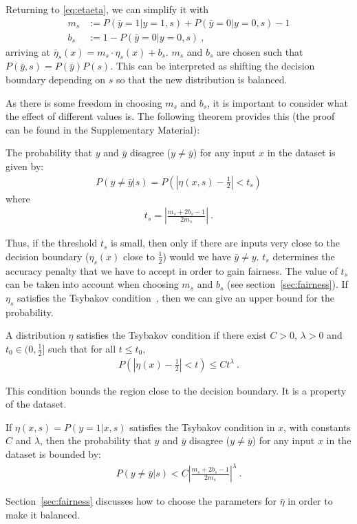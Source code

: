 Returning to \eqref{eq:etaeta}, we can simplify it with
\begin{align}
  m_s &:= P(\bar{y}=1|y=1,s) + P(\bar{y}=0|y=0,s) - 1\\
  b_s &:= 1 - P(\bar{y}=0|y=0,s)~,
\end{align}
arriving at $\bar{\eta}_s(x)=m_s\cdot \eta_s(x) + b_s$.
$m_s$ and $b_s$ are chosen such that $P(\bar{y}, s)=P(\bar{y})P(s)$.
This can be interpreted as shifting the decision boundary depending on $s$ so that the new distribution is balanced.

As there is some freedom in choosing $m_s$ and $b_s$, it is important to consider what the effect of different values is.
The following theorem provides this (the proof can be found in the Supplementary Material):

\begin{theorem}\label{th:prob}
  The probability that $y$ and $\bar{y}$ disagree ($y\neq\bar{y}$) for any input $x$ in the dataset is given by:
  \begin{align}
    P(y\neq\bar{y}|s)=P\left(\left|\eta(x,s) - \tfrac{1}{2}\right| < t_s\right)
  \end{align}
  where
  \begin{align}
    t_s = \left|\frac{m_s+2b_s-1}{2m_s}\right|~.\label{eq:def-ts}
  \end{align}
\end{theorem}
Thus, if the threshold $t_s$ is small,
then only if there are inputs very close to the decision boundary ($\eta_s(x)$ close to $\tfrac{1}{2}$)
would we have $\bar{y}\neq y$.
$t_s$ determines the accuracy penalty that we have to accept in order to gain fairness.
The value of $t_s$ can be taken into account when choosing $m_s$ and $b_s$ (see section~\ref{sec:fairness}).
If $\eta_s$ satisfies the Tsybakov condition~\citep{tsybakov2004optimal},
then we can give an upper bound for the probability.
\begin{definition}
  A distribution $\eta$ satisfies the Tsybakov condition if there exist $C>0$, $\lambda > 0$ and $t_0\in (0,\tfrac{1}{2}]$
  such that for all $t\leq t_0$,
  \begin{align}
    P\left(\left|\eta(x)-\tfrac{1}{2}\right|<t\right)\leq Ct^\lambda~.
  \end{align}
\end{definition}
This condition bounds the region close to the decision boundary.
It is a property of the dataset.
\begin{corollary}\label{th:upperbound}
  If $\eta(x,s)=P(y=1|x,s)$ satisfies the Tsybakov condition in $x$, with constants $C$ and $\lambda$,
  then the probability that $y$ and $\bar{y}$ disagree ($y\neq\bar{y}$) for any input $x$ in the dataset is bounded by:
  \begin{align}
    P(y\neq\bar{y}|s)<C\left|\frac{m_s+2b_s-1}{2m_s}\right|^\lambda~.
  \end{align}
\end{corollary}
Section~\ref{sec:fairness} discusses how to choose the parameters for $\bar{\eta}$ in order to make it balanced.

